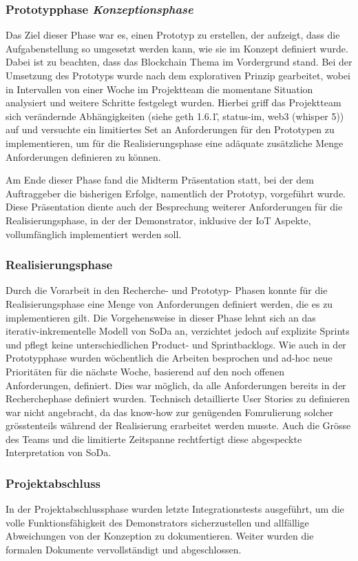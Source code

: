 \subsubsection{Prototypphase \emph{Konzeptionsphase}}
Das Ziel dieser Phase war es, einen Prototyp zu erstellen, der aufzeigt, dass die Aufgabenstellung so umgesetzt werden kann, wie sie im Konzept definiert wurde. Dabei ist zu beachten, dass das Blockchain Thema im Vordergrund stand. Bei der Umsetzung des Prototyps wurde nach dem explorativen Prinzip gearbeitet, wobei in Intervallen von einer Woche im Projektteam die momentane Situation analysiert und weitere Schritte festgelegt wurden. Hierbei griff das Projektteam sich verändernde Abhängigkeiten (siehe geth 1.6.1\^, status-im, web3 (whisper 5)) auf und versuchte ein limitiertes Set an Anforderungen für den Prototypen zu implementieren, um für die Realisierungsphase eine adäquate zusätzliche Menge Anforderungen definieren zu können.

Am Ende dieser Phase fand die Midterm Präsentation statt, bei der dem Auftraggeber die bisherigen Erfolge, namentlich der Prototyp, vorgeführt wurde. Diese Präsentation diente auch der Besprechung weiterer Anforderungen für die Realisierungsphase, in der der Demonstrator, inklusive der IoT Aspekte, vollumfänglich implementiert werden soll.

\subsubsection{Realisierungsphase}
Durch die Vorarbeit in den Recherche- und Prototyp- Phasen konnte für die Realisierungsphase eine Menge von Anforderungen definiert werden, die es zu implementieren gilt. Die Vorgehensweise in dieser Phase lehnt sich an das iterativ-inkrementelle Modell von SoDa an, verzichtet jedoch auf explizite Sprints und pflegt keine unterschiedlichen Product- und Sprintbacklogs. Wie auch in der Prototypphase wurden wöchentlich die Arbeiten besprochen und ad-hoc neue Prioritäten für die nächste Woche, basierend auf den noch offenen Anforderungen, definiert. Dies war möglich, da alle Anforderungen bereits in der Recherchephase definiert wurden. Technisch detaillierte User Stories zu definieren war nicht angebracht, da das know-how zur genügenden Fomrulierung solcher grösstenteils während der Realisierung erarbeitet werden musste. Auch die Grösse des Teams und die limitierte Zeitspanne rechtfertigt diese abgespeckte Interpretation von SoDa.

\subsubsection{Projektabschluss}
In der Projektabschlussphase wurden letzte Integrationstests ausgeführt, um die volle Funktionsfähigkeit des Demonstrators sicherzustellen und allfällige Abweichungen von der Konzeption zu dokumentieren. Weiter wurden die formalen Dokumente vervollständigt und abgeschlossen.

